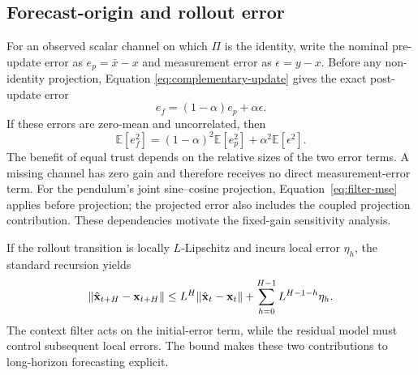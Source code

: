 \subsection{Forecast-origin and rollout error}

For an observed scalar channel on which $\Pi$ is the identity, write the
nominal pre-update error as $e_p=\bar x-x$ and measurement error as
$\epsilon=y-x$. Before any non-identity projection, Equation
\eqref{eq:complementary-update} gives the exact post-update error
\begin{equation}
 e_f=(1-\alpha)e_p+\alpha\epsilon.
\end{equation}
If these errors are zero-mean and uncorrelated, then
\begin{equation}
 \mathbb E[e_f^2]=(1-\alpha)^2\mathbb E[e_p^2]
 +\alpha^2\mathbb E[\epsilon^2].
 \label{eq:filter-mse}
\end{equation}
The benefit of equal trust depends on the relative sizes of the two error
terms. A missing channel has zero gain and therefore receives no direct
measurement-error term. For the pendulum's joint sine--cosine projection,
Equation~\eqref{eq:filter-mse} applies before projection; the projected error
also includes the coupled projection contribution. These dependencies motivate
the fixed-gain sensitivity analysis.

If the rollout transition is locally $L$-Lipschitz and incurs local error
$\eta_h$, the standard recursion yields
\begin{equation}
 \|\hat{\mathbf{x}}_{t+H}-\mathbf{x}_{t+H}\|
 \le L^H\|\hat{\mathbf{x}}_t-\mathbf{x}_t\|
 +\sum_{h=0}^{H-1}L^{H-1-h}\eta_h.
\end{equation}
The context filter acts on the initial-error term, while the residual model
must control subsequent local errors. The bound makes these two contributions
to long-horizon forecasting explicit.
